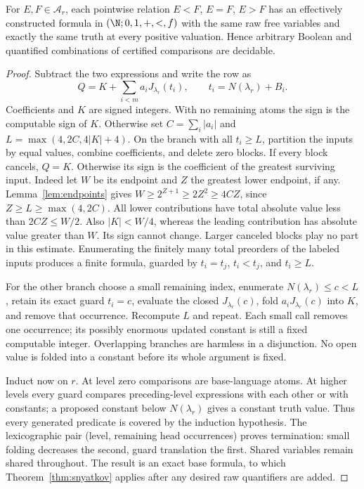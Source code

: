 \documentclass[11pt]{article}
\begin{document}
\begin{theorem}\label{thm:common}
For $E,F\in\mathcal A_r$, each pointwise relation $E<F$, $E=F$, $E>F$
has an effectively constructed formula in $(\N;0,1,+,<,f)$ with the same
raw free variables and exactly the same truth at every positive valuation.
Hence arbitrary Boolean and quantified combinations of certified comparisons
are decidable.
\end{theorem}
\begin{proof}
Subtract the two expressions and write the row as
\[
 Q=K+\sum_{i<m}a_i J_{\lambda_r}(t_i),\qquad
 t_i=N(\lambda_r)+B_i.
\]
Coefficients and $K$ are signed integers. With no remaining atoms the sign
is the computable sign of $K$. Otherwise set
$C=\sum_i|a_i|$ and $L=\max(4,2C,4|K|+4)$.
On the branch with all $t_i\ge L$, partition the inputs by equal values,
combine coefficients, and delete zero blocks. If every block cancels,
$Q=K$. Otherwise its sign is the coefficient of the greatest surviving
input. Indeed let $W$ be its endpoint and $Z$ the greatest lower endpoint,
if any. Lemma~\ref{lem:endpoints} gives
$W\ge2^{Z+1}\ge2Z^2\ge4CZ$, since $Z\ge L\ge\max(4,2C)$.
All lower contributions have total absolute value less than
$2CZ\le W/2$. Also $|K|<W/4$, whereas the leading contribution has
absolute value greater than $W$. Its sign cannot change. Larger canceled
blocks play no part in this estimate. Enumerating the finitely many total
preorders of the labeled inputs produces a finite formula, guarded by
$t_i=t_j$, $t_i<t_j$, and $t_i\ge L$.

For the other branch choose a small remaining index, enumerate
$N(\lambda_r)\le c<L$, retain its exact guard $t_i=c$, evaluate the
closed $J_{\lambda_r}(c)$, fold $a_iJ_{\lambda_r}(c)$ into $K$, and
remove that occurrence. Recompute $L$ and repeat. Each small call removes
one occurrence; its possibly enormous updated constant is still a fixed
computable integer. Overlapping branches are harmless in a disjunction.
No open value is folded into a constant before its whole argument is fixed.

Induct now on $r$. At level zero comparisons are base-language atoms.
At higher levels every guard compares preceding-level expressions with
each other or with constants; a proposed constant below $N(\lambda_r)$
gives a constant truth value. Thus every generated predicate is covered
by the induction hypothesis. The lexicographic pair (level, remaining
head occurrences) proves termination: small folding decreases the second,
guard translation the first. Shared variables remain shared throughout.
The result is an exact base formula, to which
Theorem~\ref{thm:snyatkov} applies after any desired raw quantifiers are
added.
\end{proof}
\end{document}
